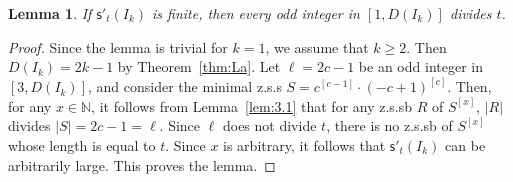 \documentclass[12 pt]{amsart}
\newtheorem{lemma}[theorem]{Lemma}
\def \N{\mathbb N}
\def \zs{z.s.s }
\def \zsb{z.s.s{\tiny b} }
\def \m{\mathsf{s}'}
\begin{document}
%
\begin{lemma}\label{lem:3.2}  If $\m_t(I_k)$ is finite, then every odd integer in $[1,D(I_k)]$ divides $t$.
\end{lemma}
%
\begin{proof}
Since the lemma is trivial for $k=1$, we assume that 
$k\geq 2$. Then
$D(I_k)=2k-1$ by Theorem~\ref{thm:La}. 
Let $\ell=2c-1$ be an odd integer in $[3,D(I_k)]$, and 
consider the minimal \zs $S=c^{[c-1]}\cdot (-c+1)^{[c]}$. 
Then, for any $x\in\N$, it follows
from Lemma~\ref{lem:3.1} that for any \zsb $R$ of $S^{[x]}$, 
$|R|$ divides $|S|=2c-1=\ell$. Since 
$\ell$ does not divide $t$, there is no \zsb of 
$S^{[x]}$ whose length is equal to $t$. Since $x$ is arbitrary, it follows that $\m_t(I_k)$ can be arbitrarily large.
This proves the lemma.  
\end{proof}
\end{document}
